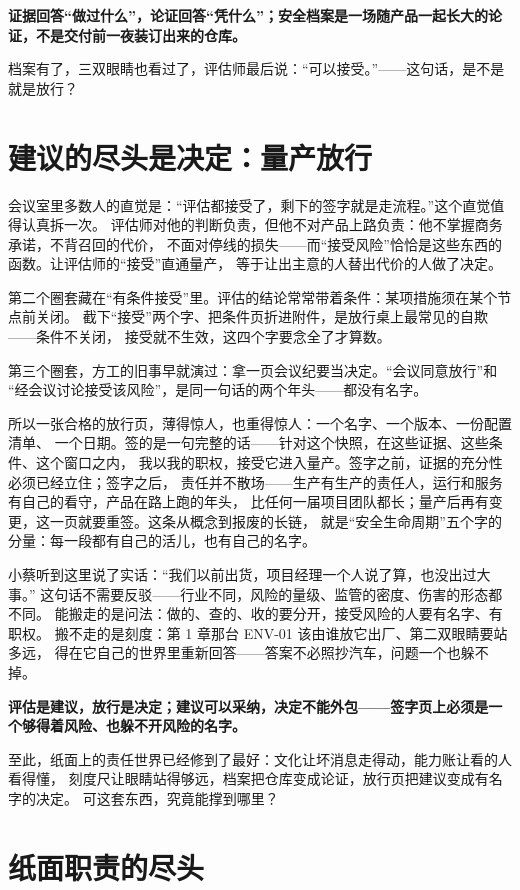 \textbf{证据回答“做过什么”，论证回答“凭什么”；安全档案是一场随产品一起长大的论证，不是交付前一夜装订出来的仓库。}

档案有了，三双眼睛也看过了，评估师最后说：“可以接受。”——这句话，是不是就是放行？

\section{建议的尽头是决定：量产放行}

会议室里多数人的直觉是：“评估都接受了，剩下的签字就是走流程。”这个直觉值得认真拆一次。
评估师对他的判断负责，但他不对产品上路负责：他不掌握商务承诺，不背召回的代价，
不面对停线的损失——而“接受风险”恰恰是这些东西的函数。让评估师的“接受”直通量产，
等于让出主意的人替出代价的人做了决定。

第二个圈套藏在“有条件接受”里。评估的结论常常带着条件：某项措施须在某个节点前关闭。
截下“接受”两个字、把条件页折进附件，是放行桌上最常见的自欺——条件不关闭，
接受就不生效，这四个字要念全了才算数。

第三个圈套，方工的旧事早就演过：拿一页会议纪要当决定。“会议同意放行”和
“经会议讨论接受该风险”，是同一句话的两个年头——都没有名字。

所以一张合格的放行页，薄得惊人，也重得惊人：一个名字、一个版本、一份配置清单、
一个日期。签的是一句完整的话——针对这个快照，在这些证据、这些条件、这个窗口之内，
我以我的职权，接受它进入量产。签字之前，证据的充分性必须已经立住；签字之后，
责任并不散场——生产有生产的责任人，运行和服务有自己的看守，产品在路上跑的年头，
比任何一届项目团队都长；量产后再有变更，这一页就要重签。这条从概念到报废的长链，
就是“安全生命周期”五个字的分量：每一段都有自己的活儿，也有自己的名字。

小蔡听到这里说了实话：“我们以前出货，项目经理一个人说了算，也没出过大事。”
这句话不需要反驳——行业不同，风险的量级、监管的密度、伤害的形态都不同。
能搬走的是问法：做的、查的、收的要分开，接受风险的人要有名字、有职权。
搬不走的是刻度：第 1 章那台 ENV-01 该由谁放它出厂、第二双眼睛要站多远，
得在它自己的世界里重新回答——答案不必照抄汽车，问题一个也躲不掉。

\textbf{评估是建议，放行是决定；建议可以采纳，决定不能外包——签字页上必须是一个够得着风险、也躲不开风险的名字。}

至此，纸面上的责任世界已经修到了最好：文化让坏消息走得动，能力账让看的人看得懂，
刻度尺让眼睛站得够远，档案把仓库变成论证，放行页把建议变成有名字的决定。
可这套东西，究竟能撑到哪里？

\section{纸面职责的尽头}

